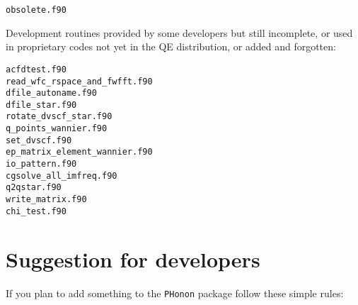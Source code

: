 \documentclass[12pt,a4paper]{article}
\begin{document}
\begin{verbatim}
obsolete.f90
\end{verbatim}

Development routines provided by some developers but still incomplete,
or used in proprietary codes not yet in the QE distribution, or added and 
forgotten:

\begin{verbatim}
acfdtest.f90              
read_wfc_rspace_and_fwfft.f90
dfile_autoname.f90          
dfile_star.f90             
rotate_dvscf_star.f90
q_points_wannier.f90
set_dvscf.f90
ep_matrix_element_wannier.f90     
io_pattern.f90                    
cgsolve_all_imfreq.f90            
q2qstar.f90
write_matrix.f90
chi_test.f90                      
\end{verbatim}

\section{Suggestion for developers}

If you plan to add something to the \texttt{PHonon} package follow these
simple rules:
\end{document}

